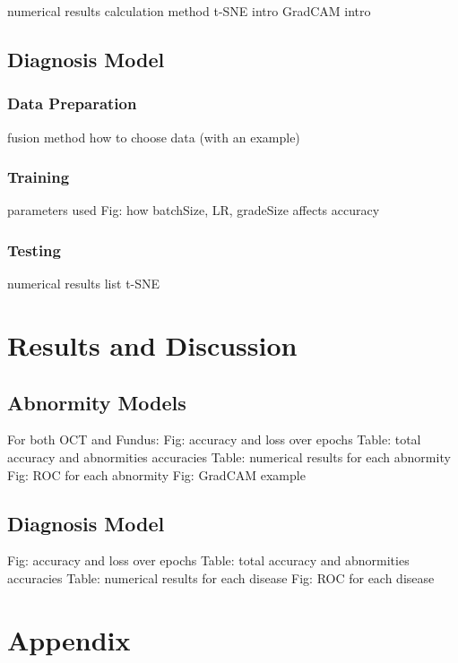 \documentclass{article}
\begin{document}
				numerical results calculation method
				t-SNE intro
				GradCAM intro
			
		\subsection{Diagnosis Model}
		
			\subsubsection{Data Preparation}
			
				fusion method
				how to choose data (with an example)
			
			\subsubsection{Training}
			
				parameters used
				Fig: how batchSize, LR, gradeSize affects accuracy
			
			\subsubsection{Testing}
			
				numerical results list
				t-SNE
	
	\section{Results and Discussion}
	
		\subsection{Abnormity Models}
			
			For both OCT and Fundus:
				Fig: accuracy and loss over epochs
				Table: total accuracy and abnormities accuracies
				Table: numerical results for each abnormity
				Fig: ROC for each abnormity
				Fig: GradCAM example
		
		\subsection{Diagnosis Model}
		
			Fig: accuracy and loss over epochs
			Table: total accuracy and abnormities accuracies
			Table: numerical results for each disease
			Fig: ROC for each disease
	
	\section{Appendix}
	
\end{document}
